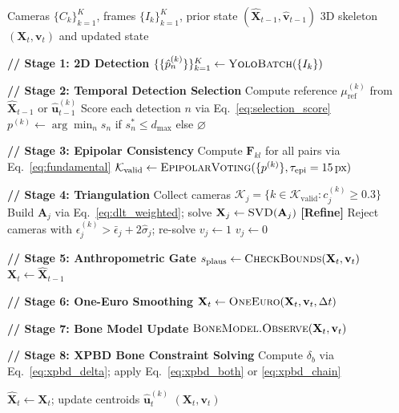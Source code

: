 \documentclass[11pt,a4paper]{article}
\begin{document}
\begin{algorithm}[ht]
\caption{LivePose: Per-Frame 3D Skeleton Estimation}
\label{alg:livepose}
\begin{algorithmic}[1]
\Require Cameras $\{C_k\}_{k=1}^{K}$, frames $\{I_k\}_{k=1}^K$,
         prior state $(\hat{\mathbf{X}}_{t-1}, \hat{\mathbf{v}}_{t-1})$
\Ensure 3D skeleton $(\mathbf{X}_t, \mathbf{v}_t)$ and updated state

\State \textbf{// Stage 1: 2D Detection}
\State $\{\{\hat{p}^{(k)}_n\}\}_{k=1}^K \leftarrow \textsc{YoloBatch}(\{I_k\})$

\State \textbf{// Stage 2: Temporal Detection Selection}
  \State Compute reference $\mu^{(k)}_\text{ref}$ from $\hat{\mathbf{X}}_{t-1}$ or $\hat{\mathbf{u}}^{(k)}_{t-1}$
  \State Score each detection $n$ via Eq.~\eqref{eq:selection_score}
  \State $p^{(k)} \leftarrow \arg\min_n s_n$ if $s^*_n \leq d_\text{max}$ else $\varnothing$
\EndFor

\State \textbf{// Stage 3: Epipolar Consistency}
\State Compute $\mathbf{F}_{kl}$ for all pairs via Eq.~\eqref{eq:fundamental}
\State $\mathcal{K}_\text{valid} \leftarrow \textsc{EpipolarVoting}(\{p^{(k)}\}, \tau_\text{epi}=15\,\text{px})$

\State \textbf{// Stage 4: Triangulation}
  \State Collect cameras $\mathcal{K}_j = \{k \in \mathcal{K}_\text{valid} : c^{(k)}_j \geq 0.3\}$
    \State Build $\mathbf{A}_j$ via Eq.~\eqref{eq:dlt_weighted}; solve $\mathbf{X}_j \leftarrow \textsc{SVD}(\mathbf{A}_j)$
    \State \textbf{[Refine]} Reject cameras with $\epsilon^{(k)}_j > \bar{\epsilon}_j + 2\hat{\sigma}_j$; re-solve
    \State $v_j \leftarrow 1$
  \Else
    \State $v_j \leftarrow 0$
  \EndIf
\EndFor

\State \textbf{// Stage 5: Anthropometric Gate}
\State $s_\text{plaus} \leftarrow \textsc{CheckBounds}(\mathbf{X}_t, \mathbf{v}_t)$
  \State $\mathbf{X}_t \leftarrow \hat{\mathbf{X}}_{t-1}$
\EndIf

\State \textbf{// Stage 6: One-Euro Smoothing}
\State $\mathbf{X}_t \leftarrow \textsc{OneEuro}(\mathbf{X}_t, \mathbf{v}_t, \Delta t)$ 

\State \textbf{// Stage 7: Bone Model Update}
\State $\textsc{BoneModel.Observe}(\mathbf{X}_t, \mathbf{v}_t)$ 

\State \textbf{// Stage 8: XPBD Bone Constraint Solving}
    \State Compute $\delta_b$ via Eq.~\eqref{eq:xpbd_delta}; apply Eq.~\eqref{eq:xpbd_both} or \eqref{eq:xpbd_chain}
  \EndFor
\EndFor

\State $\hat{\mathbf{X}}_{t} \leftarrow \mathbf{X}_t$; update centroids $\hat{\mathbf{u}}^{(k)}_{t}$
\State \Return $(\mathbf{X}_t, \mathbf{v}_t)$
\end{algorithmic}
\end{algorithm}
\end{document}
